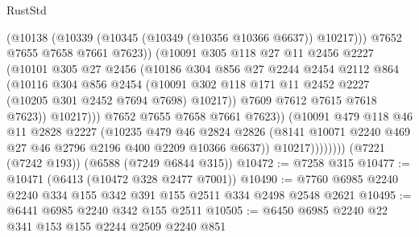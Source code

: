 \begin{lexlean}{RustStd}
\begin{coremodule}
                              (@10138 (@10339 (@10345 (@10349 (@10356 @10366 @6637)) @10217)))
                              @7652
                              @7655
                              @7658
                              @7661
                              @7623))
                          (@10091
                            @305
                            @118
                            @27
                            @11
                            @2456
                            @2227
                            (@10101
                              @305
                              @27
                              @2456
                              (@10186
                                @304
                                @856
                                @27
                                @2244
                                @2454
                                @2112
                                @864
                                (@10116
                                  @304
                                  @856
                                  @2454
                                  (@10091
                                    @302
                                    @118
                                    @171
                                    @11
                                    @2452
                                    @2227
                                    (@10205 @301 @2452 @7694 @7698)
                                    @10217))
                                @7609
                                @7612
                                @7615
                                @7618
                                @7623))
                            @10217)))
                      @7652
                      @7655
                      @7658
                      @7661
                      @7623))
                  (@10091
                    @479
                    @118
                    @46
                    @11
                    @2828
                    @2227
                    (@10235
                      @479
                      @46
                      @2824
                      @2826
                      (@8141 @10071 @2240 @469 @27 @46 @2796 @2196 @400 @2209 @10366 @6637))
                    @10217))))))))
    (@7221 (@7242 @193))
    (@6588 (@7249 @6844 @315))
@10472 := @7258 @315
@10477 := @10471 (@6413 (@10472 @328 @2477 @7001))
@10490 := @7760 @6985 @2240 @2240 @334 @155 @342 @391 @155 @2511 @334 @2498 @2548 @2621
@10495 := @6441 @6985 @2240 @342 @155 @2511
@10505 := @6450 @6985 @2240 @22 @341 @153 @155 @2244 @2509 @2240 @851

\end{coremodule}
\end{lexlean}
